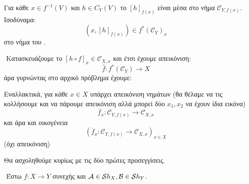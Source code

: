 \noindent Για κάθε $x \in f^{-1}(V)$ και $h \in C_Y(V)$ το $[h]_{f(x)}$ είναι μέσα στο νήμα  $\mathcal{C}_{Y,f(x)}$. Ισοδύναμα:
$$(x,[h]_{f(x)}) \in f^*(\mathcal{C}_Y)_x$$ στο νήμα του .

$ $\newline
Κατασκευάζουμε το $[h\circ f]_x \in \mathcal{C}_{X,x}$ και έτσι έχουμε απεικόνιση:
$$\hat{f} : f^*(\mathcal{C}_Y) \longrightarrow X$$ άρα γυρνώντας στο αρχικό πρόβλημα έχουμε:

\begin{figure}[H]
    \centering
\end{figure}

\noindent Εναλλακτικά, για κάθε $x \in X$ υπάρχει απεικόνιση νημάτων
(θα θέλαμε να τις κολλήσουμε και να πάρουμε απεικόνιση αλλά μπορεί δύο $x_1, x_2$ να έχουν ίδια εικόνα)
$$\overline{f}_x : \mathcal{C}_{Y,f(x)} \longrightarrow \mathcal{C}_{X,x}$$ και άρα και οικογένεια
$$(\overline{f}_x : \mathcal{C}_{Y,f(x)} \longrightarrow \mathcal{C}_{X,x})_{x \in X}$$ (όχι απεικόνιση)
\begin{figure}[H]
    \centering
\end{figure}
\noindent Θα ασχοληθούμε κυρίως με τις δύο πρώτες προσεγγίσεις.

$ $\newline
Έστω $f:X\longrightarrow Y$ συνεχής και $\mathcal A\in \mathcal{S} h_X, \mathcal B \in \mathcal{S} h_Y$.

